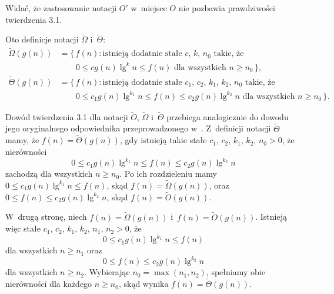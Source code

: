 Widać, że zastosowanie notacji $O'$ w~miejsce $O$ nie pozbawia prawdziwości twierdzenia 3.1.

\subproblem %
Oto definicje notacji $\widetilde{\Omega}$ i~$\widetilde{\Theta}$:
\[
	\begin{split}
		\widetilde{\Omega}(g(n)) &= \bigl\{\,f(n):\text{istnieją dodatnie stałe $c$, $k$, $n_0$ takie, że} \\
		&\qquad 0 \le cg(n)\lg^kn \le f(n) \text{ dla wszystkich $n \ge n_0$}\,\bigr\}, \\
		\widetilde{\Theta}(g(n)) &= \bigl\{\,f(n):\text{istnieją dodatnie stałe $c_1$, $c_2$, $k_1$, $k_2$, $n_0$ takie, że} \\
		&\qquad 0 \le c_1g(n)\lg^{k_1}\!n \le f(n) \le c_2g(n)\lg^{k_2}\!n \text{ dla wszystkich $n \ge n_0$}\,\bigr\}.
	\end{split}
\]

Dowód twierdzenia 3.1 dla notacji $\widetilde{O}$, $\widetilde{\Omega}$ i~$\widetilde{\Theta}$ przebiega analogicznie do dowodu jego oryginalnego odpowiednika przeprowadzonego w~.
Z~definicji notacji $\widetilde{\Theta}$ mamy, że $f(n)=\widetilde{\Theta}(g(n))$, gdy istnieją takie stałe $c_1$, $c_2$, $k_1$, $k_2$, $n_0>0$, że nierówności
\[
	0 \le c_1g(n)\lg^{k_1}\!n \le f(n) \le c_2g(n)\lg^{k_2}\!n
\]
zachodzą dla wszystkich $n\ge n_0$.
Po ich rozdzieleniu mamy $0\le c_1g(n)\lg^{k_1}\!n\le f(n)$, skąd $f(n)=\widetilde{\Omega}(g(n))$, oraz $0\le f(n)\le c_2g(n)\lg^{k_2}\!n$, skąd $f(n)=\widetilde{O}(g(n))$.

W~drugą stronę, niech $f(n)=\widetilde{\Omega}(g(n))$ i~$f(n)=\widetilde{O}(g(n))$.
Istnieją więc stałe $c_1$, $c_2$, $k_1$, $k_2$, $n_1$, $n_2>0$, że
\[
	0 \le c_1g(n)\lg^{k_1}\!n \le f(n)
\]
dla wszystkich $n\ge n_1$ oraz
\[
	0 \le f(n) \le c_2g(n)\lg^{k_2}\!n
\]
dla wszystkich $n\ge n_2$.
Wybierając $n_0=\max(n_1,n_2)$, spełniamy obie nierówności dla każdego $n\ge n_0$, skąd wynika $f(n)=\widetilde{\Theta}(g(n))$.
